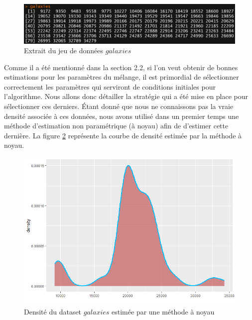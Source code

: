 \documentclass[a4paper,french,10pt]{article}
\begin{document}
\begin{figure}[htp] 
	\centering
	\includegraphics[scale=0.7]{images/dataset.png}
	\caption{Extrait du jeu de données $galaxies$}
	\label{galaxies}
\end{figure}

Comme il a été mentionné dans la section 2.2, si l'on veut obtenir de bonnes estimations pour les paramètres du mélange, il est primordial de sélectionner correctement les paramètres qui serviront de conditions initiales pour l'algorithme. Nous allons donc détailler la stratégie qui a été mise en place pour sélectionner ces derniers. Étant donné que nous ne connaissons pas la vraie densité associée à ces données, nous avons utilisé dans un premier temps une méthode d'estimation non paramétrique (à noyau) afin de d'estimer cette dernière. La figure \ref{realDataDensEst} représente la courbe de densité estimée par la méthode à noyau. 

\newpage

\begin{figure}[htp] 
	\centering
	\includegraphics[scale=0.5]{images/realDataDensEst.png}
	\caption{Densité du dataset $galaxies$ estimée par une méthode à noyau}
	\label{realDataDensEst}
\end{figure}
\end{document}
